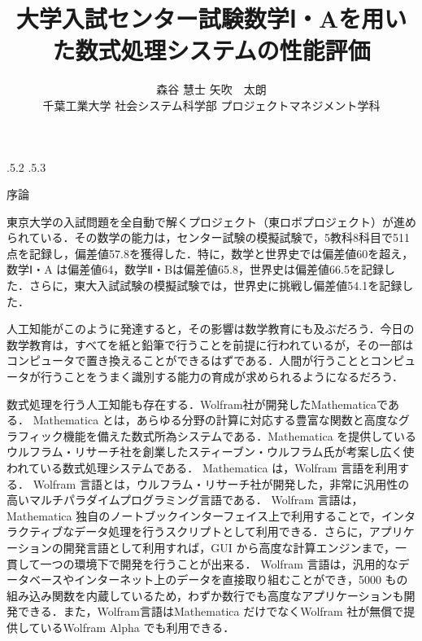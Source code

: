 \documentclass[uplatex,twocolumn]{jsarticle}
\title{\vspace{-10mm}大学入試センター試験数学Ⅰ・Aを用いた数式処理システムの性能評価 \footnotemark[0]}
\author{森谷 慧士 \footnotemark[2]\qquad 矢吹　太朗  \\ 千葉工業大学 社会システム科学部 プロジェクトマネジメント学科\footnotemark[2]}
\date{}%
\makeatletter
\renewcommand{\section}{%
    \if@slide\clearpage\fi
    \@startsection{section}{1}{\z@}%
    {\Cvs \@plus.5\Cdp \@minus.2\Cdp}%
    {.5\Cvs \@plus.3\Cdp}%
    {\normalfont\raggedright}}
\makeatother
\begin{document}
\twocolumn[\maketitle]

\begingroup
\def\thefootnote{\fnsymbol{footnote}}
\endgroup




\section{序論}


 
東京大学の入試問題を全自動で解くプロジェクト（東ロボプロジェクト）が進められている\cite{arai2014}．その数学の能力は，センター試験の模擬試験で，5教科8科目で511点を記録し，偏差値57.8を獲得した．特に，数学と世界史では偏差値60を超え，数学Ⅰ・A は偏差値64，数学Ⅱ・Bは偏差値65.8，世界史は偏差値66.5を記録した．さらに，東大入試試験の模擬試験では，世界史に挑戦し偏差値54.1を記録した\cite{tourobo}．

人工知能がこのように発達すると，その影響は数学教育にも及ぶだろう．今日の数学教育は，すべてを紙と鉛筆で行うことを前提に行われているが，その一部は コンピュータで置き換えることができるはずである．人間が行うこととコンピュータが行うことをうまく識別する能力の育成が求められるようになるだろう．



数式処理を行う人工知能も存在する．Wolfram社が開発したMathematicaである．
Mathematica とは，あらゆる分野の計算に対応する豊富な関数と高度なグラフィック機能を備えた数式所為システムである．Mathematica を提供しているウルフラム・リサーチ社を創業したスティーブン・ウルフラム氏が考案し広く使われている数式処理システムである\cite{wolfram2014}．
Mathematica は，Wolfram 言語を利用する．
Wolfram 言語とは，ウルフラム・リサーチ社が開発した，非常に汎用性の高いマルチパラダイムプログラミング言語である．
Wolfram 言語は，Mathematica 独自のノートブックインターフェイス上で利用することで，インタラクティブなデータ処理を行うスクリプトとして利用できる．さらに，アプリケーションの開発言語として利用すれば，GUI から高度な計算エンジンまで，一貫して一つの環境下で開発を行うことが出来る．
Wolfram 言語は，汎用的なデータベースやインターネット上のデータを直接取り組むことができ，5000 もの組み込み関数を内蔵しているため，わずか数行でも高度なアプリケーションも開発できる．また，Wolfram言語はMathematica だけでなくWolfram 社が無償で提供しているWolfram Alpha でも利用できる\cite{mitubisi}．
\end{document}
